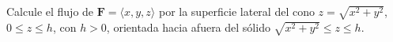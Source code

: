 ﻿Calcule el flujo de $\mathbf F=\langle x,y,z\rangle$ por la superficie lateral del cono $z=\sqrt{x^2+y^2}$, $0\leq z\leq h$, con $h>0$, orientada hacia afuera del sólido $\sqrt{x^2+y^2}\leq z\leq h$.
